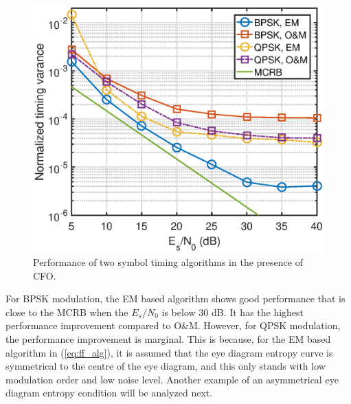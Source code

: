 \documentclass[journal,comsoc, onecolumn, 12pt,draftclsnofoot]{IEEEtran} %
\begin{document}
\begin{figure}[ht]
\centering
\includegraphics[width=3 in]{pic/per_timing_frq.eps}
\caption{Performance of two symbol timing algorithms in the presence of CFO.}
\label{fig:timing_frq_per} 
\end{figure}  

For BPSK modulation, the EM based algorithm shows good performance that is close to the MCRB when the \(E_s/N_0\) is below 30 dB.
It has the highest performance improvement compared to O\&M.
However, for QPSK modulation, the performance improvement is marginal.
This is because, for the EM based algorithm in (\ref{eq:ff_alg}), it is assumed that the eye diagram entropy curve is symmetrical to the centre of the eye diagram, and this only stands with low modulation order and low noise level.
Another example of an asymmetrical eye diagram entropy condition will be analyzed next. 
\end{document}
